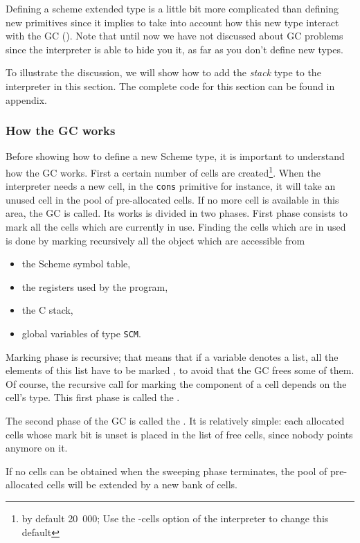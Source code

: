 \documentclass[10pt]{article}
\begin{document}
Defining a scheme extended type is a little bit more complicated than
defining new primitives since it implies to take into account how this
new type interact with the GC (). Note that
until now we have not discussed about GC problems since the
interpreter is able to hide you it, as far as you don't define new
types. 

To illustrate the discussion, we will show how to add the {\em stack}
type to the {\stk} interpreter in this section. The complete code for
this section can be found in appendix.\label{stack}

\subsubsection{How the GC works}

Before showing how to define a new Scheme type, it is important to understand
how the GC works. First a certain number of cells are created\footnote{by
default 20~000; Use the -cells option of the interpreter to change this
default}. When the interpreter needs a new cell, in the {\tt cons} primitive for
instance, it will take an unused cell in the pool of pre-allocated cells. If no
more cell is available in this area, the GC is called. Its works is divided in
two phases. First phase consists to mark all the cells which are currently in
use. Finding the cells which are in used is done by marking recursively all the
object which are accessible from
\begin{itemize}
    \item the Scheme symbol table,
    \item the registers used by the program,  
    \item the C stack,
    \item global variables of type {\tt SCM}.
\end{itemize}
Marking phase is recursive; that means that if a variable denotes a list, all
the elements of this list have to be marked , to avoid that the GC frees some of
them. Of course, the recursive call for marking the component of a cell depends
on the cell's type. This first phase is called the {\em {}}.

The second phase of the GC is called the {\em {}}. It is
relatively simple: each allocated cells whose mark bit is unset is placed in the
list of free cells, since nobody points anymore on it.

If no cells can be obtained when the sweeping phase terminates, the pool of
pre-allocated cells will be extended by a new bank of cells. 
\end{document}
